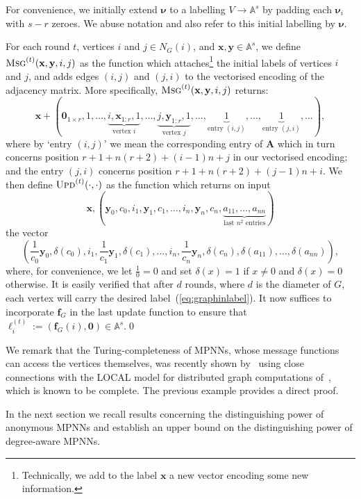 \begin{example}
For convenience, we initially extend $\pmb{\nu}$
to a labelling $V\to\mathbb{A}^s$ by padding each $\pmb{\nu}_i$ with $s-r$ zeroes. We abuse notation and also refer to this initial labelling by $\pmb{\nu}$.

For each round $t$, vertices $i$ and $j\in N_G(i)$, and $\mathbf{x},\mathbf{y}\in\mathbb{A}^s$, we define
$
\textsc{Msg}^{(t)}(\mathbf{x},\mathbf{y},i,j)
$
as the function which attaches\footnote{Technically, we add to the label
$\textbf{x}$ a new vector encoding some new information.} the initial labels of
vertices $i$ and $j$, and adds edges $(i,j)$ and $(j,i)$ to the vectorised
encoding of the adjacency matrix.  More specifically, $
\textsc{Msg}^{(t)}(\mathbf{x},\mathbf{y},i,j)
$ returns:
\[
\mathbf{x}+(\mathbf{0}_{1\times r},1,\ldots,\underbrace{i,\mathbf{x}_{1:r},1}_{\text{vertex $i$}},\ldots, \underbrace{j,\mathbf{y}_{1:r},1}_{\text{vertex $j$}},\ldots,\underbrace{1}_{\text{entry $(i,j)$}},\ldots,\underbrace{1}_{\text{entry $(j,i)$}},\ldots),
\]
where by `entry $(i,j)$' we mean the corresponding entry of $\mathbf{A}$ which in turn concerns position $r+1+n(r+2)+(i-1)n+j$ in our vectorised encoding;
and the entry $(j,i)$
concerns position $r+1+n(r+2)+(j-1)n+i$. We then define
$\textsc{Upd}^{(t)}(\cdot,\cdot)$ as the
function which returns on input 
\[
\mathbf{x}, \left(\mathbf{y}_0,c_0,i_1,\mathbf{y}_1,c_1,\ldots,i_n,\mathbf{y}_n,c_n, \underbrace{a_{11},\ldots,a_{nn}}_{\text{last $n^2$ entries}}\right)
\]
the vector
\[
\left(\frac{1}{c_0}\mathbf{y}_0,\delta(c_0),i_1,\frac{1}{c_1}\mathbf{y}_1,\delta(c_1),\ldots,
i_n,\frac{1}{c_n}\mathbf{y}_n,\delta(c_n),\delta(a_{11}),\ldots,\delta(a_{nn})\right),
\]
where, for convenience, we let $\frac{1}{0}=0$ and
set $\delta(x)=1$ if $x\neq 0$ and $\delta(x)=0$ otherwise. It is easily verified that after $d$ rounds, where $d$ is the diameter of $G$, each vertex will carry
the desired label~(\ref{eq:graphinlabel}). It now suffices to incorporate $\mathbf{f}_G$ in the last update function to ensure that $\pmb{\ell}_i^{(t)}:=(\mathbf{f}_G(i),\mathbf{0})\in\mathbb{A}^s$.\qed
\end{example}
We remark that the Turing-completeness of MPNNs, whose message functions can access  the vertices themselves, was recently shown by~\cite{Loukas2019}  using close connections with the LOCAL model for distributed graph computations of~\cite{Angluin}, which is known to be complete. The previous example provides a direct proof.

In the next section we recall results concerning the distinguishing power of anonymous MPNNs and establish an upper bound on the distinguishing power of degree-aware MPNNs.

